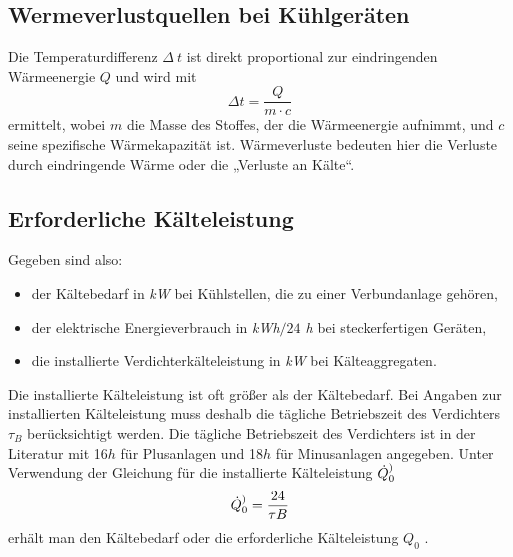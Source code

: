 \subsection{Wermeverlustquellen bei Kühlgeräten}

Die Temperaturdifferenz $\Delta\:t$ ist direkt proportional zur eindringenden Wärmeenergie $Q$ und wird mit
\begin{equation}
	\Delta t = \frac{Q}{m\cdot c}
\label{tdif}
\end{equation}
ermittelt, wobei $m$ die Masse des Stoffes, der die Wärmeenergie aufnimmt, und $c$ seine spezifische Wärmekapazität ist.
Wärmeverluste bedeuten hier die Verluste durch eindringende Wärme oder die „Verluste an Kälte“\cite{caro}.

\subsection{Erforderliche Kälteleistung}

Gegeben sind also:
\begin{itemize}
	\item der Kältebedarf in \textit{kW} bei Kühlstellen, die zu einer Verbundanlage gehören,
	\item der elektrische Energieverbrauch in \textit{kWh$/24$ h} bei steckerfertigen Geräten,
	\item die installierte Verdichterkälteleistung in \textit{kW} bei Kälteaggregaten.
\end{itemize}
Die installierte Kälteleistung ist oft größer als der Kältebedarf. Bei Angaben zur installierten Kälteleistung muss deshalb
die tägliche Betriebszeit des Verdichters $\tau_B$ berücksichtigt werden. Die tägliche Betriebszeit des Verdichters ist in der
Literatur mit 16$h$ für Plusanlagen und 18$h$ für Minusanlagen angegeben. Unter Verwendung der Gleichung für die installierte
Kälteleistung $\dot{Q}_0^)$
\begin{equation}
	\pinstall = \frac{24}{\tau{B}} \label{pinstall}
\end{equation}
\noindent erhält man den Kältebedarf oder die erforderliche Kälteleistung $Q_0$ .


